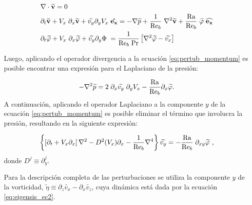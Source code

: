 \begin{align}
&\nabla \cdot \mathbf{\widetilde{v}} = 0
\label{eq:pertub_continuity} \\
&\partial_t \mathbf{\widetilde{v}} + V_x \hspace{1mm} \partial_x \mathbf{\widetilde{v}} + {\widetilde{v_y}} \partial_y V_x \hspace{1mm} \mathbf{\hat{e_x}} = - \nabla \widetilde{p} + \frac{1}{\text{Re}_b} \hspace{1mm} \nabla^2 \mathbf{\widetilde{v}} + \frac{\text{Ra}}{\text{Re}_b} \hspace{1mm} \widetilde{\varphi} \hspace{1mm}  \mathbf{\widehat{e_x}} 
\label{eq:pertub_momentum} \\
&\partial_t {\widetilde{\varphi}} + V_x \hspace{1mm} \partial_x {\widetilde{\varphi}} + {\widetilde{v_y}} \partial_y \Phi \hspace{1mm} = \frac{1}{\text{Re}_b \hspace{1mm} \text{Pr}} \left[ \nabla^2 \widetilde{\varphi} - \widetilde{v_x} \right]
\label{eq:pertub_energy} 
\end{align} 

Luego, aplicando el operador divergencia a la ecuación \ref{eq:pertub_momentum} es posible encontrar una expresión para el Laplaciano de la presión:

\begin{equation}
- \nabla^2 \widetilde{p} = 2 \hspace{1mm} \partial_x \widetilde{v_y} \hspace{1mm} \partial_y V_x - \frac{\text{Ra}}{\text{Re}_b} \partial_x \widetilde{\varphi} \text{.}
\label{eq:pressure_eigen}
\end{equation}
A continuación, aplicando el operador Laplaciano a la componente $y$ de la ecuación \ref{eq:pertub_momentum} es posible eliminar el término que involucra la presión, resultando en la siguiente expresión:

\begin{equation}
\left\lbrace \left[ \partial_t + V_x \partial_x \right] \nabla^2 - D^2(V_x) \partial_x - \frac{1}{\text{Re}_b} \nabla^4 \right\rbrace \widetilde{v_y} = - \frac{\text{Ra}}{\text{Re}_b} \hspace{1mm} \partial_{xy} \widetilde{\varphi} \text{ ,}
\label{eq:eigensis_ec1}
\end{equation}
donde $D^j \equiv \partial^j_y$. 

Para la descripción completa de las perturbaciones se utiliza la componente $y$ de la vorticidad, $\widetilde{\eta} \equiv \partial_z \widetilde{v_x} - \partial_x \widetilde{v_z}$, cuya dinámica está dada por la ecuación \ref{eq:eigensis_ec2}.

